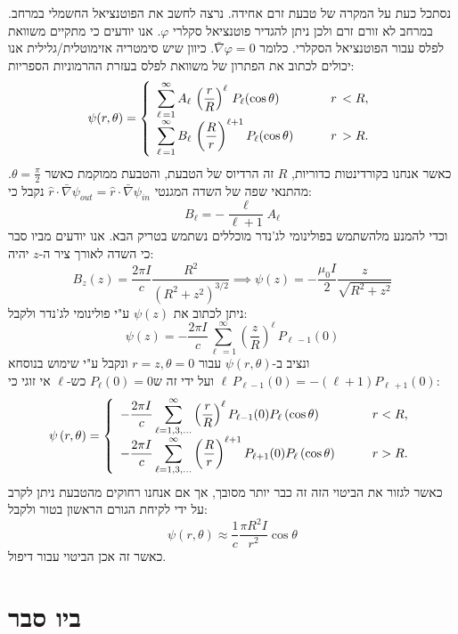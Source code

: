 \documentclass{tstextbook}
\begin{document}
\begin{example}
נסתכל כעת על המקרה של טבעת זרם אחידה. נרצה לחשב את הפוטנציאל החשמלי במרחב. במרחב לא זורם זרם ולכן ניתן להגדיר פוטנציאל סקלרי \(\varphi\).
אנו יודעים כי מתקיים משוואת לפלס עבור הפוטנציאל הסקלרי. כלומר \(\bar{\nabla}\varphi=0\). כיוון שיש סימטריה אזימוטלית/גלילית אנו יכולים לכתוב את הפתרון של משוואת לפלס בעזרת ההרמוניות הספריות:
$$\psi(r,\theta)=\left\{\begin{array}{l l}{{\displaystyle\sum_{\ell\,=1}^{\infty}A_{\ell}\,\left(\frac{r}{R}\right)^{\ell}\,P_{\ell}(\cos\theta)\qquad}}&{{r\,<R,}}\\ {{\displaystyle\sum_{\ell\,=1}^{\infty}B_{\ell}\,\left(\frac{R}{r}\right)^{\ell+1}P_{\ell}(\cos\theta)\qquad}}&{{r\,>R.}}\end{array}\right.$$
כאשר אנחנו בקורדינטות כדוריות, \(R\) זה הרדיוס של הטבעת, והטבעת ממוקמת כאשר \(\theta=\frac{\pi}{2}\). מהתנאי שפה של השדה המגנטי  \(\hat{r}\cdot \bar{\nabla} \psi_{out}=\hat{r}\cdot \bar{\nabla}\psi_{in}\) נקבל כי:
$$B_{\ell}=-{\frac{\ell}{\ell+1}}A_{\ell}$$
וכדי להמנע מלהשתמש בפולינומי לג'נדר מוכללים נשתמש בטריק הבא. אנו יודעים מביו סבר כי השדה לאורך ציר ה-\(z\) יהיה:
$$B_{z}(z)=\frac{2\pi I}{c}\frac{R^{2}}{(R^{2}+z^{2})^{3/2}}\implies \psi(z)=-{\frac{\mu_{0}I}{2}}{\frac{z}{\sqrt{R^{2}+z^{2}}}}$$
ניתן לכתוב את \(\psi(z)\) ע"י פולינומי לג'נדר ולקבל:
$$\psi(z)=-\frac{2\pi I}{c}\sum_{\ell\,=1}^{\infty}\left(\frac{z}{R}\right)^{\ell}\,P_{\ell\,-1}(0)$$
ונציב ב-\(\psi\left( r,\theta \right)\) עבור \(r=z,\theta=0\) ונקבל ע"י שימוש בנוסחא \(\ell\,P_{\ell-1}(0)=-(\ell+1)P_{\ell\,+1}(0)\) ועל ידי זה ש\(P_{\ell}(0)=0\) כש-\(\ell\) אי זוגי כי:
$$\psi\left( r,\theta \right)=\left\{\begin{array}{l l}{{\displaystyle-\frac{2\pi I}{c}\sum_{\ell=1,3,...}^{\infty}\left(\frac{r}{R}\right)^{\ell}P_{\ell-1}(0)P_{\ell}\left( \cos\theta \right)\qquad}}&{{r<R,}}\\ {{\displaystyle-\frac{2\pi I}{c}\sum_{\ell=1,3,...}^{\infty}\left(\frac{R}{r}\right)^{\ell+1}P_{\ell+1}(0)P_{\ell}\left( \cos\theta \right)\qquad}}&{{r>R.}}\end{array}\right.$$
כאשר לגזור את הביטוי הזה זה כבר יותר מסובך, אך אם אנחנו רחוקים מהטבעת ניתן לקרב על ידי לקיחת הגורם הראשון בטור ולקבל:
$$\psi\left( r,\theta \right)\approx\frac{1}{c}\frac{\pi R^{2}I}{r^{2}}\cos\theta$$
כאשר זה אכן הביטוי עבור דיפול.

\end{example}
\section{ביו סבר}
\end{document}
